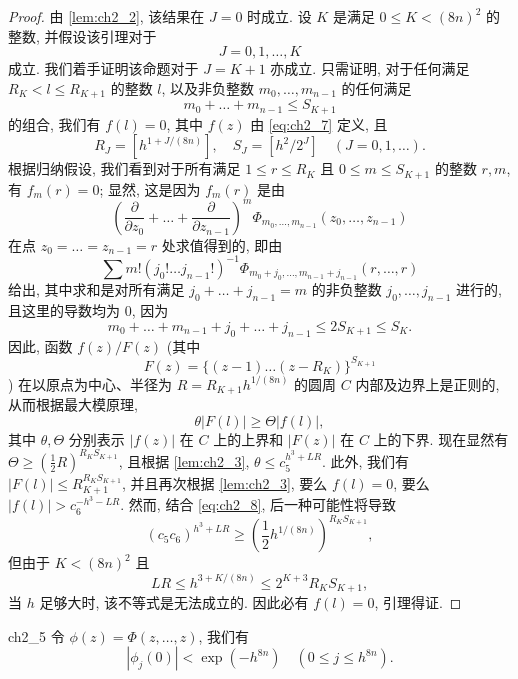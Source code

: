 \begin{proof}
由 \autoref{lem:ch2_2}, 该结果在 $J = 0$ 时成立. 设 $K$ 是满足 $0 \le K < (8n)^2$ 的整数, 并假设该引理对于
\[
J = 0, 1, \dots, K
\]
成立. 我们着手证明该命题对于 $J = K + 1$ 亦成立.
只需证明, 对于任何满足 $R_K < l \le R_{K+1}$ 的整数 $l$, 以及非负整数 $m_0, \dots, m_{n-1}$ 的任何满足
\[
m_0 + \dots + m_{n-1} \le S_{K+1}
\]
的组合, 我们有 $f(l) = 0$, 其中 $f(z)$ 由 \eqref{eq:ch2_7} 定义, 且
\[
R_J = \left[h^{1+J/(8n)}\right], \quad S_J = \left[h^2/2^J\right] \quad (J = 0, 1, \dots).
\]
根据归纳假设, 我们看到对于所有满足 $1 \le r \le R_K$ 且 $0 \le m \le S_{K+1}$ 的整数 $r, m$, 有 $f_m(r) = 0$; 显然, 这是因为 $f_m(r)$ 是由
\[
\left(\frac{\partial}{\partial z_0} + \dots + \frac{\partial}{\partial z_{n-1}}\right)^m \Phi_{m_0, \dots, m_{n-1}}(z_0, \dots, z_{n-1})
\]
在点 $z_0 = \dots = z_{n-1} = r$ 处求值得到的, 即由
\[
\sum m! (j_0! \dots j_{n-1}!)^{-1} \Phi_{m_0+j_0, \dots, m_{n-1}+j_{n-1}}(r, \dots, r)
\]
给出, 其中求和是对所有满足 $j_0 + \dots + j_{n-1} = m$ 的非负整数 $j_0, \dots, j_{n-1}$ 进行的, 且这里的导数均为 $0$, 因为
\[
m_0 + \dots + m_{n-1} + j_0 + \dots + j_{n-1} \le 2S_{K+1} \le S_K.
\]
因此, 函数 $f(z)/F(z)$ (其中
\[
F(z) = \{(z-1) \dots (z-R_K)\}^{S_{K+1}}
\]
) 在以原点为中心、半径为 $R = R_{K+1} h^{1/(8n)}$ 的圆周 $C$ 内部及边界上是正则的, 从而根据最大模原理,
\begin{equation} \label{eq:ch2_8}\tag{8}
\theta |F(l)| \ge \Theta |f(l)|,
\end{equation}
其中 $\theta, \Theta$ 分别表示 $|f(z)|$ 在 $C$ 上的上界和 $|F(z)|$ 在 $C$ 上的下界. 现在显然有 $\Theta \ge (\frac{1}{2}R)^{R_K S_{K+1}}$, 且根据 \autoref{lem:ch2_3}, $\theta \le c_5^{h^3+LR}$. 此外, 我们有 $|F(l)| \le R_{K+1}^{R_K S_{K+1}}$, 并且再次根据 \autoref{lem:ch2_3}, 要么 $f(l) = 0$, 要么 $|f(l)| > c_6^{-h^3-LR}$. 然而, 结合 \eqref{eq:ch2_8}, 后一种可能性将导致
\[
(c_5 c_6)^{h^3+LR} \ge \left(\frac{1}{2} h^{1/(8n)}\right)^{R_K S_{K+1}},
\]
但由于 $K < (8n)^2$ 且
\[
LR \le h^{3+K/(8n)} \le 2^{K+3} R_K S_{K+1},
\]
当 $h$ 足够大时, 该不等式是无法成立的. 因此必有 $f(l) = 0$, 引理得证.
\end{proof}

\begin{mylemma}{}{ch2_5}
令 $\phi(z) = \Phi(z, \dots, z)$, 我们有
\begin{equation} \label{eq:ch2_9}\tag{9}
|\phi_j(0)| < \exp(-h^{8n}) \quad (0 \le j \le h^{8n}).
\end{equation}
\end{mylemma}


